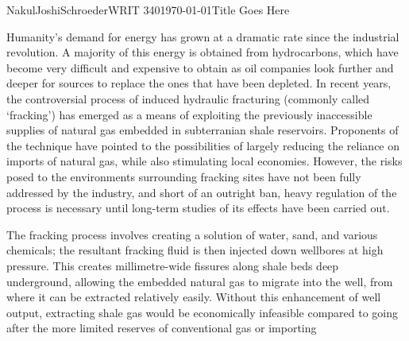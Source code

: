 \documentclass[12pt,letterpaper]{article}
\begin{document}
\begin{mla}{Nakul}{Joshi}{Schroeder}{WRIT 340}{\today}{Title Goes Here}

Humanity's demand for energy has grown at a dramatic rate since the industrial revolution. A majority of this energy is obtained from hydrocarbons, which have become very difficult and expensive to obtain as oil companies look further and deeper for sources to replace the ones that have been depleted. In recent years, the controversial process of induced hydraulic fracturing (commonly called `fracking') has emerged as a means of exploiting the previously inaccessible supplies of natural gas embedded in subterranian shale reservoirs. Proponents of the technique have pointed to the possibilities of largely reducing the reliance on imports of natural gas, while also stimulating local economies. However, the risks posed to the environments surrounding fracking sites have not been fully addressed by the industry, and short of an outright ban, heavy regulation of the process is necessary until long-term studies of its effects have been carried out.

The fracking process involves creating a solution of water, sand, and various chemicals; the resultant fracking fluid is then injected down wellbores at high pressure. This creates millimetre-wide fissures along shale beds deep underground, allowing the embedded natural gas to migrate into the well, from where it can be extracted relatively easily. Without this enhancement of well output, extracting shale gas would be economically infeasible compared to going after the more limited reserves of conventional gas or importing

\end{mla}
\end{document}
